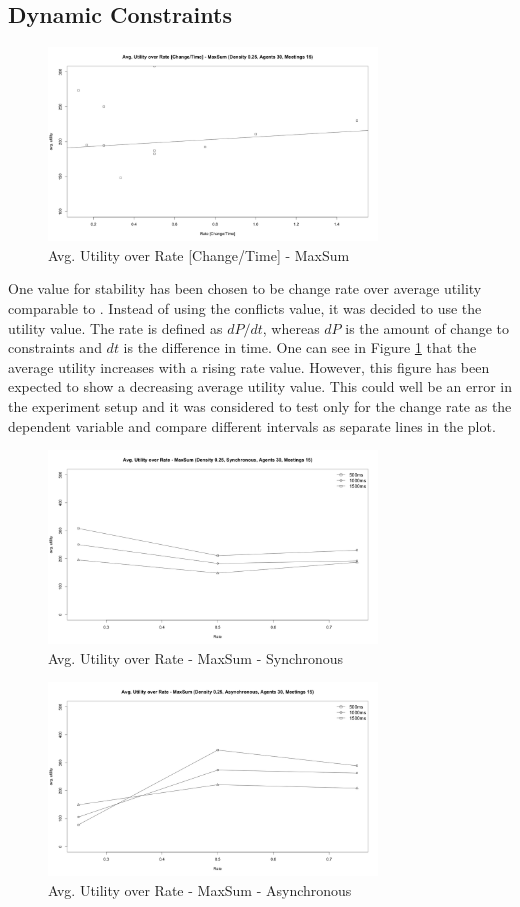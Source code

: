 \subsection{Dynamic Constraints}

\begin{figure}[h]
\centering
\includegraphics[width=330px]{graphics/experiments/dynamic/d_1.png}
\caption{Avg. Utility over Rate [Change/Time] - MaxSum}
\label{fig:d_1}
\end{figure}

One value for stability has been chosen to be change rate over average utility comparable to \cite{Maillera}. Instead of using the conflicts value, it was decided to use the utility value. The rate is defined as \(dP/dt\), whereas \(dP\) is the amount of change to constraints and \(dt\) is the difference in time. One can see in Figure \ref{fig:d_1} that the average utility increases with a rising rate value. However, this figure has been expected to show a decreasing average utility value. This could well be an error in the experiment setup and it was considered to test only for the change rate as the dependent variable and compare different intervals as separate lines in the plot.

\begin{figure}[H]
\centering
\includegraphics[width=330px]{graphics/experiments/dynamic/d_2.png}
 \caption{Avg. Utility over Rate - MaxSum - Synchronous}
  \label{fig:d_2}
\end{figure}
\begin{figure}[H]
\centering
\includegraphics[width=330px]{graphics/experiments/dynamic/d_3.png}
  \caption{Avg. Utility over Rate - MaxSum - Asynchronous}
\label{fig:d_3}
\end{figure}

